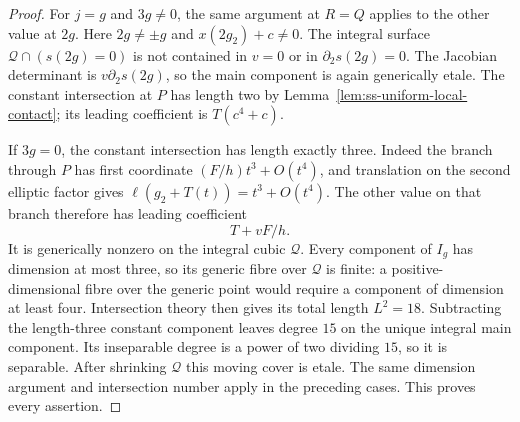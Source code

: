 \begin{proof}
For $j=g$ and $3g\ne0$, the same argument at $R=Q$ applies to
the other value at $2g$. Here $2g\ne\pm g$ and
$x(2g_2)+c\ne0$. The integral surface
$\mathcal Q\cap(s(2g)=0)$ is not contained in $v=0$ or in
$\partial_2s(2g)=0$. The Jacobian determinant is
$v\partial_2s(2g)$, so the main component is again generically
etale. The constant intersection at $P$ has length two by
Lemma~\ref{lem:ss-uniform-local-contact}; its leading coefficient
is $T(c^4+c)$.

If $3g=0$, the constant intersection has length exactly three.
Indeed the branch through $P$ has first coordinate
$(F/h)t^3+O(t^4)$, and translation on the second elliptic factor
gives $\ell(g_2+T(t))=t^3+O(t^4)$. The other value on that branch
therefore has leading coefficient
\begin{equation}\label{eq:ss-flex-contact-length}
                             T+vF/h.
\end{equation}
It is generically nonzero on the integral cubic $\mathcal Q$.
Every component of $I_g$ has dimension at most three, so its
generic fibre over $\mathcal Q$ is finite: a positive-dimensional
fibre over the generic point would require a component of dimension
at least four. Intersection theory then gives its total length
$L^2=18$. Subtracting the length-three constant component leaves
degree $15$ on the unique integral main component. Its inseparable
degree is a power of two dividing $15$, so it is separable.
After shrinking $\mathcal Q$ this moving cover is etale.
The same dimension argument and intersection number apply in the
preceding cases. This proves every assertion.
\end{proof}


